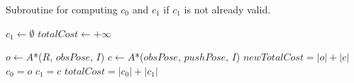 \begin{algorithm}[H]

  \caption{Subroutine for computing $c_{0}$ and $c_{1}$ if $c_{1}$ is not already valid.}

  \label{alg:04-custom-observation-simple-compute01c1}
  
  \begin{algorithmic}[1]

      \State $c_{1} \gets \emptyset$
      \State $totalCost \gets +\infty$

        \State $o \gets A$*($R$, $obsPose$, $I$)
        \State $c \gets A$*($obsPose$, $pushPose$, $I$)
        \State $newTotalCost = |o| + |c|$
          \State $c_{0} = o$
          \State $c_{1} = c$
          \State $totalCost = |c_{0}| + |c_{1}|$
        \EndIf
      \EndFor
    \EndProcedure

  \end{algorithmic}
\end{algorithm}
